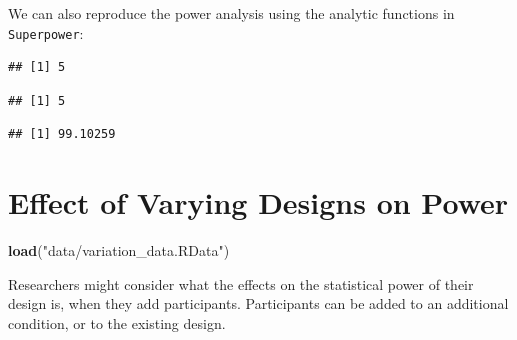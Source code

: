 \documentclass[
]{book}
\newenvironment{Shaded}{\begin{snugshade}}{\end{snugshade}}
\newcommand{\KeywordTok}[1]{\textcolor[rgb]{0.13,0.29,0.53}{\textbf{#1}}}
\newcommand{\NormalTok}[1]{#1}
\newcommand{\OperatorTok}[1]{\textcolor[rgb]{0.81,0.36,0.00}{\textbf{#1}}}
\newcommand{\StringTok}[1]{\textcolor[rgb]{0.31,0.60,0.02}{#1}}
\begin{document}
We can also reproduce the power analysis using the analytic functions in \texttt{Superpower}:

\begin{Shaded}
\end{Shaded}

\begin{verbatim}
## [1] 5
\end{verbatim}

\begin{Shaded}
\end{Shaded}

\begin{verbatim}
## [1] 5
\end{verbatim}

\begin{Shaded}
\end{Shaded}

\begin{verbatim}
## [1] 99.10259
\end{verbatim}

\hypertarget{effect-of-varying-designs-on-power}{%
\chapter{Effect of Varying Designs on Power}\label{effect-of-varying-designs-on-power}}

\begin{Shaded}
\begin{Highlighting}[]
\KeywordTok{load}\NormalTok{(}\StringTok{"data/variation_data.RData"}\NormalTok{)}
\end{Highlighting}
\end{Shaded}

Researchers might consider what the effects on the statistical power of their design is, when they add participants. Participants can be added to an additional condition, or to the existing design.
\end{document}
